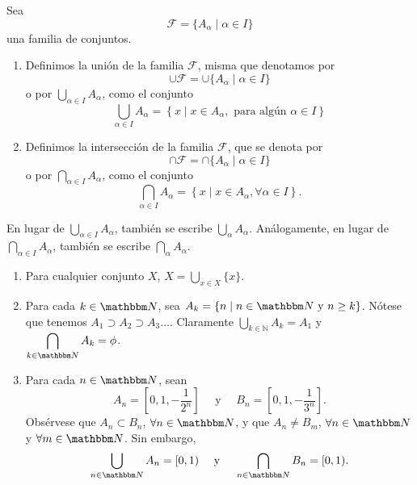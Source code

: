 \newpage

\begin{definicion}{}{}
    Sea
    $$\mathcal{F} = \{A_\alpha \mid \alpha \in I\}$$
    una familia de conjuntos.
    \begin{enumerate}[label=\roman*., topsep=6pt, itemsep=0pt]
        \item Definimos la unión de la familia $\mathcal{F}$, misma que denotamos por
        $$\cup \mathcal{F} = \cup \{A_\alpha \mid \alpha \in I\}$$
        o por $\displaystyle \bigcup_{\alpha \in I} A_\alpha$, como el conjunto
        $$\bigcup_{\alpha \in I} A_\alpha = \left\{x \mid x \in A_\alpha, \text{ para algún } \alpha \in I\right\}$$
        \item Definimos la intersección de la familia $\mathcal{F}$, que se denota por
        $$\cap \mathcal{F} = \cap \{A_\alpha \mid \alpha \in I\}$$
        o por $\displaystyle \bigcap_{\alpha \in I} A_\alpha$, como el conjunto
        $$\bigcap_{\alpha \in I} A_\alpha = \left\{x \mid x \in A_\alpha, \forall \alpha \in I\right\}.$$
    \end{enumerate}
\end{definicion}

En lugar de $\displaystyle \bigcup_{\alpha \in I} A_\alpha$, también se escribe $\displaystyle \bigcup_\alpha A_\alpha$. Análogamente, en lugar de $\displaystyle \bigcap_{\alpha \in I} A_\alpha$, también se escribe $\displaystyle \bigcap_\alpha A_\alpha$.

\begin{examplebox}{}{}
    \begin{enumerate}[label=\roman*., topsep=6pt, itemsep=0pt]
        \item Para cualquier conjunto $X$, $X = \displaystyle \bigcup_{x \in X}\{x\}$.
        \item Para cada $k \in \NN$, sea $A_k = \{n \mid n \in \NN \text{ y } n \geq k\}$. Nótese que tenemos $A_1 \supset A_2 \supset A_3 \dots$. Claramente $\displaystyle \bigcup_{k \in \mathbb{N}} A_k = A_1$ y $\displaystyle \bigcap_{k \in \NN} A_k = \phi$.
        \item Para cada $n \in \NN$, sean
        $$A_n=\left[0, 1, -\frac{1}{2^n} \right] \quad \text{ y } \quad B_n=\left[0, 1, -\frac{1}{3^n} \right].$$
        Obsérvese que $A_n \subset B_n$, $\forall n \in \NN$, y que $A_n \neq B_m$, $\forall n \in \NN$ y $\forall m \in \NN$. Sin embargo,
        $$\bigcup_{n \in \NN}A_n = [0, 1) \quad \text{ y } \quad \bigcap_{n \in \NN}B_n = [0, 1).$$
    \end{enumerate}
\end{examplebox}

